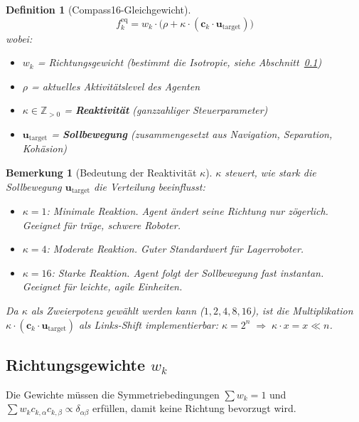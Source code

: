 \documentclass[11pt,a4paper]{article}
\newtheorem{definition}{Definition}
\newtheorem{remark}{Bemerkung}
\newcommand{\feq}{f^{\mathrm{eq}}}
\begin{document}
\begin{definition}[Compass16-Gleichgewicht]\label{def:feq}
\begin{equation}\label{eq:feq}
\feq_k = w_k \cdot \Big(\rho + \kappa \cdot (\mathbf{c}_k \cdot \mathbf{u}_{\mathrm{target}})\Big)
\end{equation}
wobei:
\begin{itemize}[itemsep=2pt]
\item $w_k$ = Richtungsgewicht (bestimmt die Isotropie, siehe Abschnitt~\ref{sec:weights})
\item $\rho$ = aktuelles Aktivit\"atslevel des Agenten
\item $\kappa \in \mathbb{Z}_{>0}$ = \textbf{Reaktivit\"at} (ganzzahliger Steuerparameter)
\item $\mathbf{u}_{\mathrm{target}}$ = \textbf{Sollbewegung} (zusammengesetzt aus Navigation, Separation, Koh\"asion)
\end{itemize}
\end{definition}

\begin{remark}[Bedeutung der Reaktivit\"at $\kappa$]
$\kappa$ steuert, wie stark die Sollbewegung $\mathbf{u}_{\mathrm{target}}$ die Verteilung beeinflusst:
\begin{itemize}[itemsep=2pt]
\item $\kappa = 1$: Minimale Reaktion. Agent \"andert seine Richtung nur z\"ogerlich.
Geeignet f\"ur tr\"age, schwere Roboter.
\item $\kappa = 4$: Moderate Reaktion. Guter Standardwert f\"ur Lagerroboter.
\item $\kappa = 16$: Starke Reaktion. Agent folgt der Sollbewegung fast instantan.
Geeignet f\"ur leichte, agile Einheiten.
\end{itemize}
Da $\kappa$ als Zweierpotenz gew\"ahlt werden kann ($1, 2, 4, 8, 16$),
ist die Multiplikation $\kappa \cdot (\mathbf{c}_k \cdot \mathbf{u}_{\mathrm{target}})$
als Links-Shift implementierbar: $\kappa = 2^n \;\Rightarrow\; \kappa \cdot x = x \ll n$.
\end{remark}

\subsection{Richtungsgewichte $w_k$}\label{sec:weights}

Die Gewichte m\"ussen die Symmetriebedingungen
$\sum w_k = 1$ und $\sum w_k c_{k,\alpha} c_{k,\beta} \propto \delta_{\alpha\beta}$
erf\"ullen, damit keine Richtung bevorzugt wird.
\end{document}
